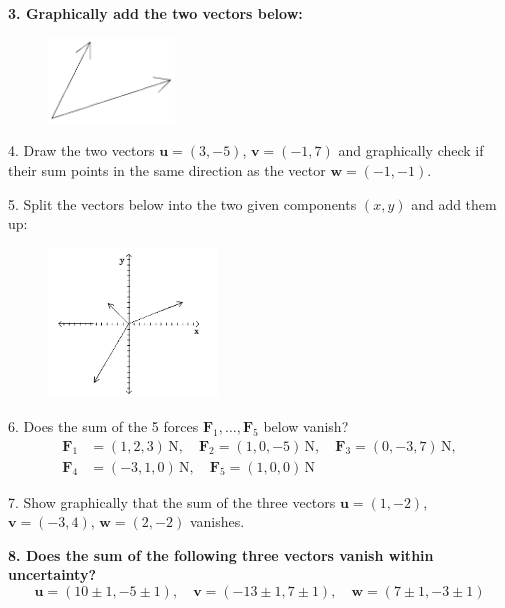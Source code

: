 {\bf{3. Graphically add the two vectors below:}}
\begin{figure}[h]
    \begin{center}
        \includegraphics[width=0.3\textwidth]{./Exp3/pic/image4.png}
    \end{center}
\end{figure}

4. Draw the two vectors $\mathbf{u} = (3,-5)$, $\mathbf{v} = (-1,7)$ and graphically check if their sum points in the same direction as the vector $\mathbf{w} = (-1,-1)$.\myskip

5. Split the vectors below into the two given components $(x,y)$ and add them up:
\begin{figure}[h]
    \begin{center}
        \includegraphics[width=0.4\textwidth]{./Exp3/pic/image5.png}
    \end{center}
\end{figure}

6. Does the sum of the 5 forces $\mathbf{F}_1,\dots,\mathbf{F}_5$ below vanish?
\begin{align*}
    \mathbf{F}_1 &= (1,2,3)\,\mathrm{N},\quad \mathbf{F}_2 = (1,0,-5)\,\mathrm{N},\quad \mathbf{F}_3 = (0,-3,7)\,\mathrm{N}, \\ 
    \mathbf{F}_4 &= (-3,1,0)\,\mathrm{N},\quad \mathbf{F}_5 = (1,0,0)\,\mathrm{N}
\end{align*}

7. Show graphically that the sum of the three vectors $\mathbf{u} = (1,-2)$, $\mathbf{v} = (-3,4)$, $\mathbf{w} = (2,-2)$ vanishes.\myskip

{\bf{8. Does the sum of the following three vectors vanish within uncertainty?}}
\begin{equation*}
    \mathbf{u} = (10 \pm 1, -5 \pm 1),\quad \mathbf{v} = (-13 \pm 1, 7 \pm 1),\quad \mathbf{w} = (7 \pm 1, -3 \pm 1)
\end{equation*}


